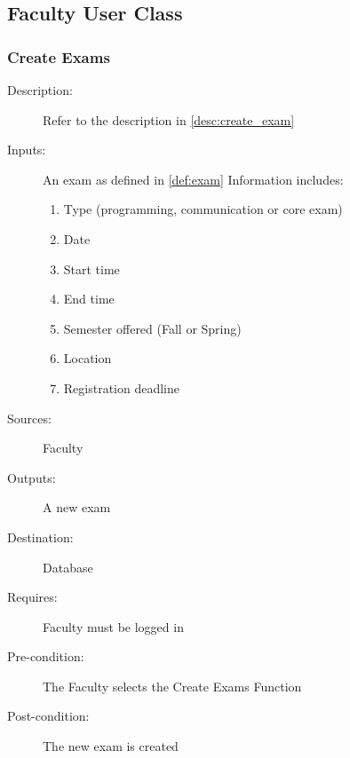 \subsection{Faculty User Class}

\subsubsection{\large Create Exams} 
\begin{boxed} %
\begin{description}
\item[Description:]
   Refer to the description in \autoref{desc:create_exam}
\item[Inputs:]
   An exam as defined in \autoref{def:exam} Information includes:
   \begin{enumerate}
      \item Type (programming, communication or core exam)
      \item Date
      \item Start time
      \item End time
      \item Semester offered (Fall or Spring)
      \item Location
      \item Registration deadline
   \end{enumerate}
\item[Sources:]
   Faculty
\item[Outputs:]
   A new exam
\item[Destination:]
   Database
\item[Requires:]
   Faculty must be logged in
\item[Pre-condition:]
   The Faculty selects the Create Exams Function
\item[Post-condition:]
   The new exam is created
\end{description}
\end{boxed} %


